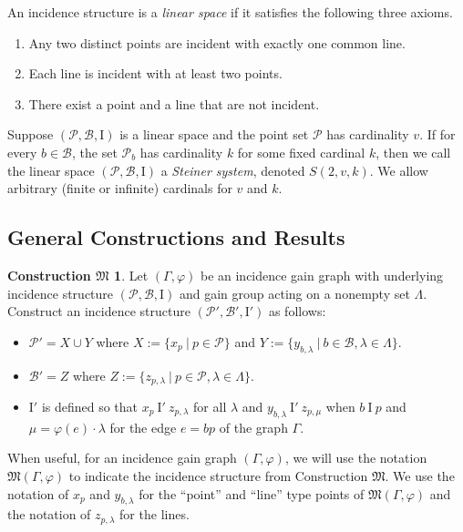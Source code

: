\documentclass[11pt]{article}
\theoremstyle{definition}
\newtheorem*{construction*}{Construction $\mathfrak{M}$}
\begin{document}
An incidence structure is a \textit{linear space} if it satisfies the following three axioms.

\begin{enumerate}
\item Any two distinct points are incident with exactly one common line.
\item Each line is incident with at least two points.
\item There exist a point and a line that are not incident.
\end{enumerate}

Suppose $(\mathscr{P},\mathscr{B},\mathrm{I})$ is a linear space and the point set $\mathscr{P}$ has cardinality $v$.  If for every $b \in \mathscr{B}$, the set $\mathscr{P}_b$ has cardinality $k$ for some fixed cardinal $k$, then we call the linear space $(\mathscr{P},\mathscr{B},\mathrm{I})$ a \textit{Steiner system}, denoted $S(2,v,k)$.  We allow arbitrary (finite or infinite) cardinals for $v$ and $k$.

\subsection{General Constructions and Results}

\begin{construction*}
Let $(\Gamma,\varphi)$ be an incidence gain graph with underlying incidence structure $(\mathscr{P},\mathscr{B},\mathrm{I})$ and gain group acting on a nonempty set $\Lambda$.  Construct an incidence structure $(\mathscr{P}',\mathscr{B}',\mathrm{I}')$ as follows:

\begin{itemize}
\item $\mathscr{P}' = X \cup Y$ where $X := \{ x_p \  | \  p \in \mathscr{P} \}$ and $Y := \{ y_{b,\lambda} \  | \  b \in \mathscr{B}, \lambda \in \Lambda \}$.
\item $\mathscr{B}' = Z$ where $Z := \{ z_{p,\lambda} \  | \  p \in \mathscr{P}, \lambda \in \Lambda \}$.
\item $\mathrm{I}'$ is defined so that $x_p \  \mathrm{I}' \  z_{p,\lambda}$ for all $\lambda$ and $y_{b,\lambda} \  \mathrm{I}' \  z_{p,\mu}$ when $b \  \mathrm{I} \  p$ and $\mu = \varphi(e) \cdot \lambda$ for the edge $e = bp$ of the graph $\Gamma$.
\end{itemize}
\end{construction*}

When useful, for an incidence gain graph $(\Gamma,\varphi)$, we will use the notation $\mathfrak{M}(\Gamma,\varphi)$ to indicate the incidence structure from Construction $\mathfrak{M}$.  We use the notation of $x_p$ and $y_{b,\lambda}$ for the ``point'' and ``line'' type points of $\mathfrak{M}(\Gamma,\varphi)$ and the notation of $z_{p,\lambda}$ for the lines.  
\end{document}
